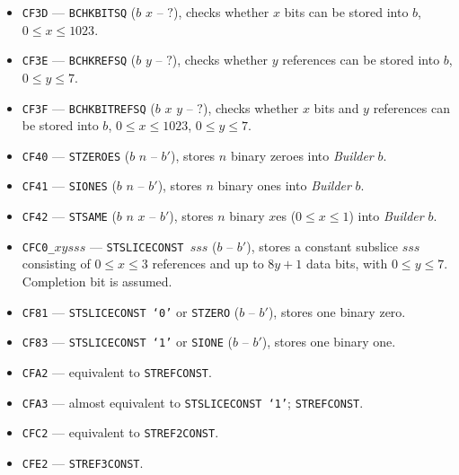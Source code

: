\documentclass[12pt,oneside]{article}
\begin{document}
\begin{itemize}
\item {\tt CF3D} --- {\tt BCHKBITSQ} ($b$ $x$ -- $?$), checks whether $x$ bits can be stored into $b$, $0\leq x\leq 1023$.
\item {\tt CF3E} --- {\tt BCHKREFSQ} ($b$ $y$ -- $?$), checks whether $y$ references can be stored into $b$, $0\leq y\leq 7$.
\item {\tt CF3F} --- {\tt BCHKBITREFSQ} ($b$ $x$ $y$ -- $?$), checks whether $x$ bits and $y$ references can be stored into $b$, $0\leq x\leq 1023$, $0\leq y\leq 7$.
\item {\tt CF40} --- {\tt STZEROES} ($b$ $n$ -- $b'$), stores $n$ binary zeroes into {\em Builder} $b$.
\item {\tt CF41} --- {\tt SIONES} ($b$ $n$ -- $b'$), stores $n$ binary ones into {\em Builder} $b$.
\item {\tt CF42} --- {\tt STSAME} ($b$ $n$ $x$ -- $b'$), stores $n$ binary $x$es ($0\leq x\leq1$) into {\em Builder} $b$.
\item {\tt CFC0\_$xysss$} --- {\tt STSLICECONST $sss$} ($b$ -- $b'$), stores a constant subslice $sss$ consisting of $0\leq x\leq 3$ references and up to $8y+1$ data bits, with $0\leq y\leq 7$. Completion bit is assumed.
\item {\tt CF81} --- {\tt STSLICECONST `0'} or {\tt STZERO} ($b$ -- $b'$), stores one binary zero.
\item {\tt CF83} --- {\tt STSLICECONST `1'} or {\tt SIONE} ($b$ -- $b'$), stores one binary one.
\item {\tt CFA2} --- equivalent to {\tt STREFCONST}.
\item {\tt CFA3} --- almost equivalent to {\tt STSLICECONST `1'}; {\tt STREFCONST}.
\item {\tt CFC2} --- equivalent to {\tt STREF2CONST}.
\item {\tt CFE2} --- {\tt STREF3CONST}.
\end{itemize}
\end{document}
